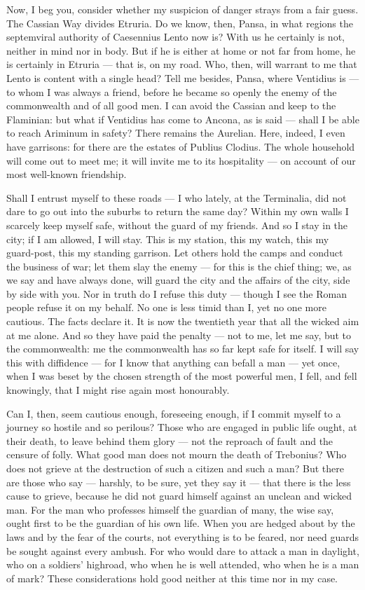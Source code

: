  Now, I beg you, consider whether my suspicion of danger strays from a fair guess. The Cassian Way divides Etruria. Do we know, then, Pansa, in what regions the septemviral authority of Caesennius Lento now is? With us he certainly is not, neither in mind nor in body. But if he is either at home or not far from home, he is certainly in Etruria --- that is, on my road. Who, then, will warrant to me that Lento is content with a single head? Tell me besides, Pansa, where Ventidius is --- to whom I was always a friend, before he became so openly the enemy of the commonwealth and of all good men. I can avoid the Cassian and keep to the Flaminian: but what if Ventidius has come to Ancona, as is said --- shall I be able to reach Ariminum in safety? There remains the Aurelian. Here, indeed, I even have garrisons: for there are the estates of Publius Clodius. The whole household will come out to meet me; it will invite me to its hospitality --- on account of our most well-known friendship.

 Shall I entrust myself to these roads --- I who lately, at the Terminalia, did not dare to go out into the suburbs to return the same day? Within my own walls I scarcely keep myself safe, without the guard of my friends. And so I stay in the city; if I am allowed, I will stay. This is my station, this my watch, this my guard-post, this my standing garrison. Let others hold the camps and conduct the business of war; let them slay the enemy --- for this is the chief thing; we, as we say and have always done, will guard the city and the affairs of the city, side by side with you. Nor in truth do I refuse this duty --- though I see the Roman people refuse it on my behalf. No one is less timid than I, yet no one more cautious. The facts declare it. It is now the twentieth year that all the wicked aim at me alone. And so they have paid the penalty --- not to me, let me say, but to the commonwealth: me the commonwealth has so far kept safe for itself. I will say this with diffidence --- for I know that anything can befall a man --- yet once, when I was beset by the chosen strength of the most powerful men, I fell, and fell knowingly, that I might rise again most honourably.

 Can I, then, seem cautious enough, foreseeing enough, if I commit myself to a journey so hostile and so perilous? Those who are engaged in public life ought, at their death, to leave behind them glory --- not the reproach of fault and the censure of folly. What good man does not mourn the death of Trebonius? Who does not grieve at the destruction of such a citizen and such a man? But there are those who say --- harshly, to be sure, yet they say it --- that there is the less cause to grieve, because he did not guard himself against an unclean and wicked man. For the man who professes himself the guardian of many, the wise say, ought first to be the guardian of his own life. When you are hedged about by the laws and by the fear of the courts, not everything is to be feared, nor need guards be sought against every ambush. For who would dare to attack a man in daylight, who on a soldiers' highroad, who when he is well attended, who when he is a man of mark? These considerations hold good neither at this time nor in my case.

